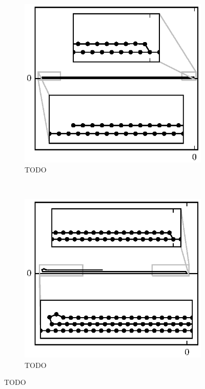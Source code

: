 	\begin{figure}
		\centering
		\begin{subfigure}{.5\textwidth}
			\centering
			\includegraphics{./fig/ch3/fs/b5_eb3.eps}
			\caption{TODO \label{subfig:fs_down}}
		\end{subfigure}%
		~
		\begin{subfigure}{.5\textwidth}
			\centering
			\includegraphics{./fig/ch3/fs/b2_eb6.eps}
			\caption{TODO \label{subfig:fs_onefold}}
		\end{subfigure}


\end{figure}
